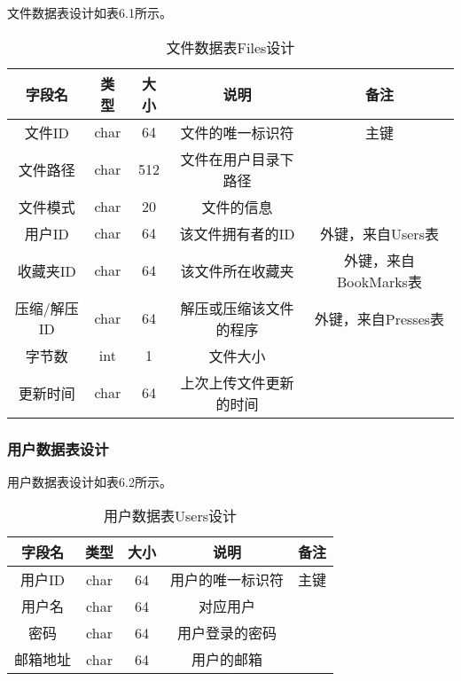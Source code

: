 文件数据表设计如表6.1所示。
\begin{table}[htbp]
\centering
\caption{文件数据表Files设计} \label{tab:files-database}
\begin{tabular}{|c|c|c|c|c|}
    \hline
    字段名 & 类型 & 大小 & 说明 & 备注 \\
    \hline
    文件ID & char & 64 & 文件的唯一标识符 & 主键\\
    \hline
    文件路径 & char & 512 & 文件在用户目录下路径 & \\
    \hline
    文件模式 & char & 20 & 文件的信息& \\
    \hline
    用户ID & char & 64 & 该文件拥有者的ID & 外键，来自Users表 \\
    \hline
    收藏夹ID & char & 64 & 该文件所在收藏夹 & 外键，来自BookMarks表 \\
    \hline
    压缩/解压ID & char & 64 & 解压或压缩该文件的程序 & 外键，来自Presses表 \\
    \hline
    字节数 & int & 1 & 文件大小 & \\
    \hline
    更新时间 & char & 64 & 上次上传文件更新的时间 & \\
    \hline
\end{tabular}
\end{table}

\subsubsection{用户数据表设计}
用户数据表设计如表6.2所示。
\begin{table}[htbp]
\centering
\caption{用户数据表Users设计} \label{tab:user-database}
\begin{tabular}{|c|c|c|c|c|}
    \hline
    字段名 & 类型 & 大小 & 说明 & 备注 \\
    \hline
    用户ID & char & 64 & 用户的唯一标识符 & 主键\\
    \hline
    用户名 & char & 64 & 对应用户 & \\
    \hline
    密码 & char & 64 & 用户登录的密码 & \\
    \hline
    邮箱地址 & char & 64 & 用户的邮箱 & \\
    \hline
\end{tabular}
\end{table}

